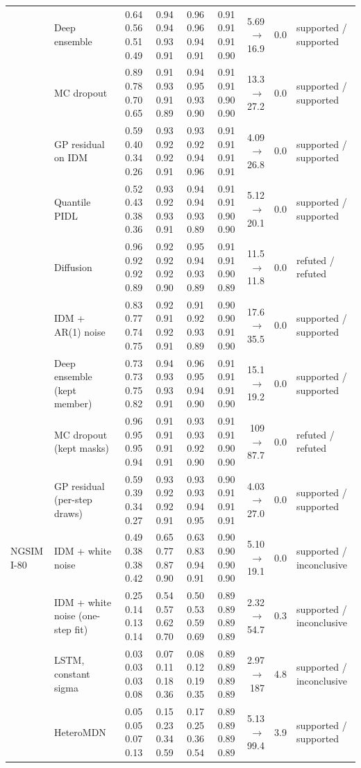 \begin{longtable}{llrrrrrrl}
 & Deep ensemble & 0.64 0.56 0.51 0.49 & 0.94 0.94 0.93 0.91 & 0.96 0.96 0.94 0.91 & 0.91 0.91 0.91 0.90 & 5.69 $\rightarrow$ 16.9 & 0.0 & supported / supported \\
 & MC dropout & 0.89 0.78 0.70 0.65 & 0.91 0.93 0.91 0.89 & 0.94 0.95 0.93 0.90 & 0.91 0.91 0.90 0.90 & 13.3 $\rightarrow$ 27.2 & 0.0 & supported / supported \\
 & GP residual on IDM & 0.59 0.40 0.34 0.26 & 0.93 0.92 0.92 0.91 & 0.93 0.92 0.94 0.96 & 0.91 0.91 0.91 0.91 & 4.09 $\rightarrow$ 26.8 & 0.0 & supported / supported \\
 & Quantile PIDL & 0.52 0.43 0.38 0.36 & 0.93 0.92 0.93 0.91 & 0.94 0.94 0.93 0.89 & 0.91 0.91 0.90 0.90 & 5.12 $\rightarrow$ 20.1 & 0.0 & supported / supported \\
 & Diffusion & 0.96 0.92 0.92 0.89 & 0.92 0.92 0.92 0.90 & 0.95 0.94 0.93 0.89 & 0.91 0.91 0.90 0.89 & 11.5 $\rightarrow$ 11.8 & 0.0 & refuted / refuted \\
 & IDM + AR(1) noise & 0.83 0.77 0.74 0.75 & 0.92 0.91 0.92 0.91 & 0.91 0.92 0.93 0.89 & 0.90 0.90 0.91 0.90 & 17.6 $\rightarrow$ 35.5 & 0.0 & supported / supported \\
 & Deep ensemble (kept member) & 0.73 0.73 0.75 0.82 & 0.94 0.93 0.93 0.91 & 0.96 0.95 0.94 0.90 & 0.91 0.91 0.91 0.90 & 15.1 $\rightarrow$ 19.2 & 0.0 & supported / supported \\
 & MC dropout (kept masks) & 0.96 0.95 0.95 0.94 & 0.91 0.91 0.91 0.91 & 0.93 0.93 0.92 0.90 & 0.91 0.91 0.90 0.90 & 109 $\rightarrow$ 87.7 & 0.0 & refuted / refuted \\
 & GP residual (per-step draws) & 0.59 0.39 0.34 0.27 & 0.93 0.92 0.92 0.91 & 0.93 0.93 0.94 0.95 & 0.90 0.91 0.91 0.91 & 4.03 $\rightarrow$ 27.0 & 0.0 & supported / supported \\
\midrule
NGSIM I-80 & IDM + white noise & 0.49 0.38 0.38 0.42 & 0.65 0.77 0.87 0.90 & 0.63 0.83 0.94 0.91 & 0.90 0.90 0.90 0.90 & 5.10 $\rightarrow$ 19.1 & 0.0 & supported / inconclusive \\
 & IDM + white noise (one-step fit) & 0.25 0.14 0.13 0.14 & 0.54 0.57 0.62 0.70 & 0.50 0.53 0.59 0.69 & 0.89 0.89 0.89 0.89 & 2.32 $\rightarrow$ 54.7 & 0.3 & supported / inconclusive \\
 & LSTM, constant sigma & 0.03 0.03 0.03 0.08 & 0.07 0.11 0.18 0.36 & 0.08 0.12 0.19 0.35 & 0.89 0.89 0.89 0.89 & 2.97 $\rightarrow$ 187 & 4.8 & supported / inconclusive \\
 & HeteroMDN & 0.05 0.05 0.07 0.13 & 0.15 0.23 0.34 0.59 & 0.17 0.25 0.36 0.54 & 0.89 0.89 0.89 0.89 & 5.13 $\rightarrow$ 99.4 & 3.9 & supported / supported \\

\end{longtable}
